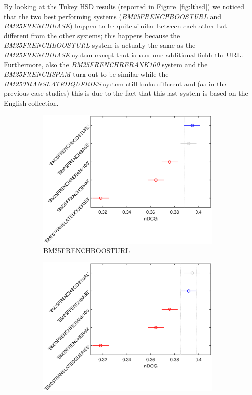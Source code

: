 \par
By looking at the Tukey HSD results (reported in Figure~\ref{fig:lthsd}) we noticed that the two best performing systems (\textit{BM25FRENCHBOOSTURL} and \textit{BM25FRENCHBASE}) happen to be quite similar between each other but different from the other systems; this happens because the \textit{BM25FRENCHBOOSTURL} system is actually the same as the \textit{BM25FRENCHBASE} system except that is uses one additional field: the URL. Furthermore, also the \textit{BM25FRENCHRERANK100} system and the \textit{BM25FRENCHSPAM} turn out to be similar while the \textit{BM25TRANSLATEDQUERIES} system still looks different and (as in the previous case studies) this is due to the fact that this last system is based on the English collection.  
\begin{figure}[p]
     \centering
     \begin{subfigure}[b]{0.49\textwidth}
         \centering
         \includegraphics[width=\textwidth]{figure/longterm/tukeyhsd-1.eps}
         \caption{BM25FRENCHBOOSTURL}
         \label{fig:lthsd1}
     \end{subfigure}
     \hfill
     \begin{subfigure}[b]{0.49\textwidth}
         \centering
         \includegraphics[width=\textwidth]{figure/longterm/tukeyhsd-2.eps}

\end{subfigure}
\end{figure}
